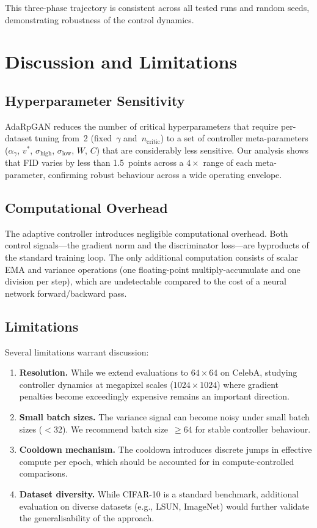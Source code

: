 \documentclass{article}
\newcommand{\vtarget}{v^{*}}
\newcommand{\ncritic}{n_{\mathrm{critic}}}
\begin{document}
This three-phase trajectory is consistent across all tested runs and random seeds, demonstrating robustness of the control dynamics.

\section{Discussion and Limitations}
\label{sec:discussion}

\subsection{Hyperparameter Sensitivity}

AdaRpGAN reduces the number of critical hyperparameters that require per-dataset tuning from~2 (fixed~$\gamma$ and~$\ncritic$) to a set of controller meta-parameters ($\alpha_\gamma$, $\vtarget$, $\sigma_{\mathrm{high}}$, $\sigma_{\mathrm{low}}$, $W$, $C$) that are considerably less sensitive. Our analysis shows that FID varies by less than 1.5~points across a $4{\times}$ range of each meta-parameter, confirming robust behaviour across a wide operating envelope.

\subsection{Computational Overhead}

The adaptive controller introduces negligible computational overhead. Both control signals---the gradient norm and the discriminator loss---are byproducts of the standard training loop. The only additional computation consists of scalar EMA and variance operations (one floating-point multiply-accumulate and one division per step), which are undetectable compared to the cost of a neural network forward/backward pass.

\subsection{Limitations}

Several limitations warrant discussion:

\begin{enumerate}
    \item \textbf{Resolution.} While we extend evaluations to $64{\times}64$ on CelebA, studying controller dynamics at megapixel scales ($1024{\times}1024$) where gradient penalties become exceedingly expensive remains an important direction.
    \item \textbf{Small batch sizes.} The variance signal can become noisy under small batch sizes ($<$32). We recommend batch size~$\geq$64 for stable controller behaviour.
    \item \textbf{Cooldown mechanism.} The cooldown introduces discrete jumps in effective compute per epoch, which should be accounted for in compute-controlled comparisons.
    \item \textbf{Dataset diversity.} While CIFAR-10 is a standard benchmark, additional evaluation on diverse datasets (e.g., LSUN, ImageNet) would further validate the generalisability of the approach.
\end{enumerate}
\end{document}
